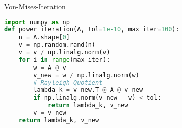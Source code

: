 \begin{examplecode}{Von-Mises-Iteration}
\begin{lstlisting}[language=Python, style=basesmol]
import numpy as np
def power_iteration(A, tol=1e-10, max_iter=100):
    n = A.shape[0]
    v = np.random.rand(n)
    v = v / np.linalg.norm(v)
    for i in range(max_iter):
        w = A @ v
        v_new = w / np.linalg.norm(w)
        # Rayleigh-Quotient
        lambda_k = v_new.T @ A @ v_new
        if np.linalg.norm(v_new - v) < tol:
            return lambda_k, v_new
        v = v_new
    return lambda_k, v_new
\end{lstlisting}
\end{examplecode}